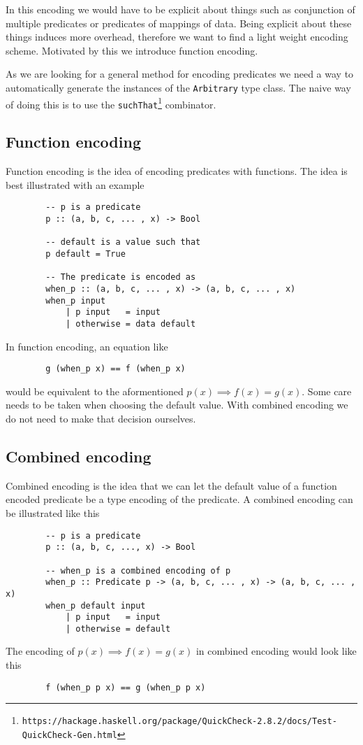         In this encoding we would have to be explicit about things such as conjunction
        of multiple predicates or predicates of mappings of data.
        Being explicit about these things induces more overhead, therefore
        we want to find a light weight encoding scheme. Motivated by this
        we introduce function encoding.

        As we are looking for a general method for encoding predicates we need
        a way to automatically generate the instances of the \texttt{Arbitrary} type class.
        The naive way of doing this is to use the
        \texttt{suchThat}\footnote{\texttt{https://hackage.haskell.org/package/QuickCheck-2.8.2/docs/Test-QuickCheck-Gen.html}} 
        combinator. 

    \subsection{Function encoding}

        Function encoding is the idea of encoding 
        predicates with functions. The idea is best
        illustrated with an example
        \begin{verbatim}
        -- p is a predicate
        p :: (a, b, c, ... , x) -> Bool

        -- default is a value such that
        p default = True

        -- The predicate is encoded as
        when_p :: (a, b, c, ... , x) -> (a, b, c, ... , x)
        when_p input
            | p input   = input
            | otherwise = data default
        \end{verbatim}
        In function encoding, an equation like
        \begin{verbatim}
        g (when_p x) == f (when_p x)
        \end{verbatim}
        would be equivalent to the aformentioned $p(x) \implies f(x) = g(x)$.
        Some care needs to be taken when choosing the default value.
        With combined encoding we do not need to make that decision ourselves.

     \subsection{Combined encoding}\label{combined_encoding}
        
        Combined encoding is the idea that we can let the
        default value of a function encoded predicate be a type
        encoding of the predicate. A combined encoding can be illustrated
        like this
        \begin{verbatim}
        -- p is a predicate
        p :: (a, b, c, ..., x) -> Bool  

        -- when_p is a combined encoding of p
        when_p :: Predicate p -> (a, b, c, ... , x) -> (a, b, c, ... , x)
        when_p default input
            | p input   = input
            | otherwise = default
        \end{verbatim}
        The encoding of $p(x) \implies f(x) = g(x)$ in combined encoding would look like
        this
        \begin{verbatim}
        f (when_p p x) == g (when_p p x)
        \end{verbatim}
